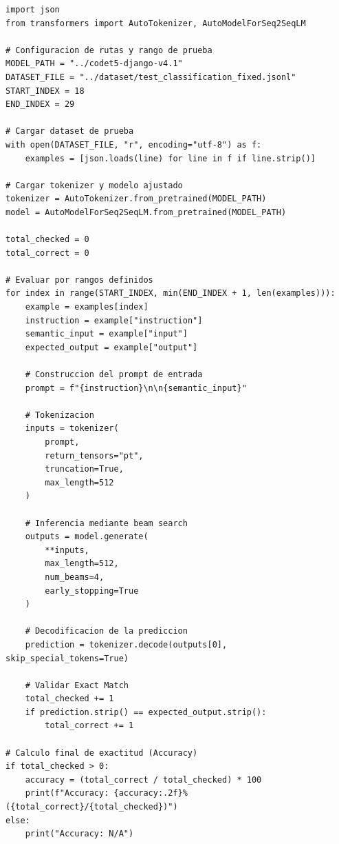 \begin{lstlisting}[caption={Script resumido para la evaluación de inferencia y cálculo de exactitud del modelo CodeT5}, label={anx:code-evaluation}]
import json
from transformers import AutoTokenizer, AutoModelForSeq2SeqLM

# Configuracion de rutas y rango de prueba
MODEL_PATH = "../codet5-django-v4.1"
DATASET_FILE = "../dataset/test_classification_fixed.jsonl"
START_INDEX = 18
END_INDEX = 29

# Cargar dataset de prueba
with open(DATASET_FILE, "r", encoding="utf-8") as f:
    examples = [json.loads(line) for line in f if line.strip()]

# Cargar tokenizer y modelo ajustado
tokenizer = AutoTokenizer.from_pretrained(MODEL_PATH)
model = AutoModelForSeq2SeqLM.from_pretrained(MODEL_PATH)

total_checked = 0
total_correct = 0

# Evaluar por rangos definidos
for index in range(START_INDEX, min(END_INDEX + 1, len(examples))):
    example = examples[index]
    instruction = example["instruction"]
    semantic_input = example["input"]
    expected_output = example["output"]

    # Construccion del prompt de entrada
    prompt = f"{instruction}\n\n{semantic_input}"

    # Tokenizacion
    inputs = tokenizer(
        prompt, 
        return_tensors="pt", 
        truncation=True, 
        max_length=512
    )

    # Inferencia mediante beam search
    outputs = model.generate(
        **inputs,
        max_length=512,
        num_beams=4,
        early_stopping=True
    )

    # Decodificacion de la prediccion
    prediction = tokenizer.decode(outputs[0], skip_special_tokens=True)

    # Validar Exact Match
    total_checked += 1
    if prediction.strip() == expected_output.strip():
        total_correct += 1

# Calculo final de exactitud (Accuracy)
if total_checked > 0:
    accuracy = (total_correct / total_checked) * 100
    print(f"Accuracy: {accuracy:.2f}% ({total_correct}/{total_checked})")
else:
    print("Accuracy: N/A")
\end{lstlisting}